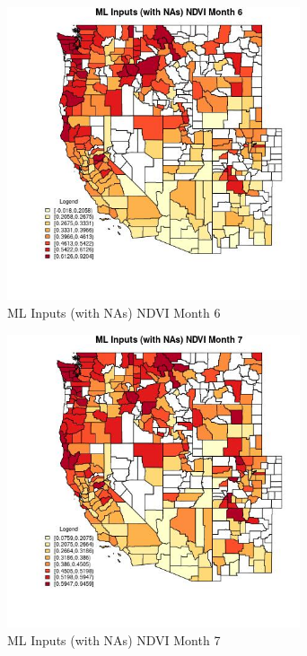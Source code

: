 \begin{figure} 
\centering  
\includegraphics[width=0.77\textwidth]{Code_Outputs/Report_ML_input_PM25_Step4_part_f_de_duplicated_aveswNAs_CountyNDVImedianMonth6.jpg} 
\caption{\label{fig:Report_ML_input_PM25_Step4_part_f_de_duplicated_aveswNAsCountyNDVImedianMonth6}ML Inputs (with NAs) NDVI Month 6} 
\end{figure} 
 

\begin{figure} 
\centering  
\includegraphics[width=0.77\textwidth]{Code_Outputs/Report_ML_input_PM25_Step4_part_f_de_duplicated_aveswNAs_CountyNDVImedianMonth7.jpg} 
\caption{\label{fig:Report_ML_input_PM25_Step4_part_f_de_duplicated_aveswNAsCountyNDVImedianMonth7}ML Inputs (with NAs) NDVI Month 7} 
\end{figure} 
 

